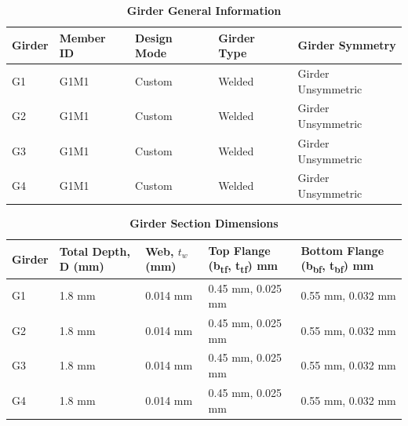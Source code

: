 \documentclass[12pt,a4paper]{report}
\numberwithin{table}{chapter}
\numberwithin{figure}{chapter}
\begin{document}
\newpage

\vspace{0.4em}
\noindent
            
\vspace{4pt}
\begin{longtable}{|L{2.2cm}|L{1.8cm}|p{3.8cm}|p{3.8cm}|p{3.8cm}|}
\caption{\textbf{Girder General Information}}
\hline
\textbf{Girder} & \textbf{Member ID} & \textbf{Design Mode} & \textbf{Girder Type} & \textbf{Girder Symmetry} \\[6pt]
\hline
G1 & G1M1 & Custom & Welded & Girder Unsymmetric \\[8pt]
\hline
G2 & G1M1 & Custom & Welded & Girder Unsymmetric \\[8pt]
\hline
G3 & G1M1 & Custom & Welded & Girder Unsymmetric \\[8pt]
\hline
G4 & G1M1 & Custom & Welded & Girder Unsymmetric \\[8pt]
\hline
\end{longtable}

\vspace{0.6em}

\vspace{4pt}
\begin{longtable}{|L{1.8cm}|L{2.3cm}|L{1.8cm}|p{4.8cm}|p{4.8cm}|}
\caption{\textbf{Girder Section Dimensions}}
\hline
\textbf{Girder} & \textbf{Total Depth, D (mm)} & \textbf{Web, $t_w$ (mm)} & \textbf{Top Flange (b\textsubscript{tf}, t\textsubscript{tf}) mm} & \textbf{Bottom Flange (b\textsubscript{bf}, t\textsubscript{bf}) mm} \\[6pt]
\hline
G1 & 1.8 mm & 0.014 mm & 0.45 mm, 0.025 mm & 0.55 mm, 0.032 mm \\[8pt]
\hline
G2 & 1.8 mm & 0.014 mm & 0.45 mm, 0.025 mm & 0.55 mm, 0.032 mm \\[8pt]
\hline
G3 & 1.8 mm & 0.014 mm & 0.45 mm, 0.025 mm & 0.55 mm, 0.032 mm \\[8pt]
\hline
G4 & 1.8 mm & 0.014 mm & 0.45 mm, 0.025 mm & 0.55 mm, 0.032 mm \\[8pt]
\hline
\end{longtable}

\vspace{0.6em}
\end{document}
